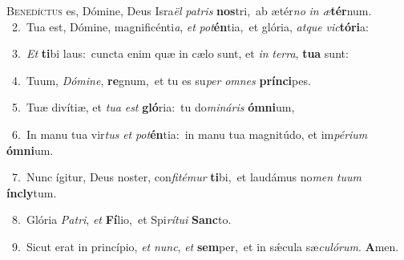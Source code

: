 \lettrine{\initial\textcolor{\initialcolor}{B}}{enedíctus} es, Dómine, Deus Isra\textit{ël} \textit{pa}\-\textit{tris} \textbf{nos}\-tri,~\star ab ætér\textit{no} \textit{in} \textit{æ}\-\textbf{tér}num.\\
{\numbfont\textcolor{\numbcolor}{~2.}}~Tua est, Dómine, magnificénti\-\textit{a}\-, \textit{et} \textit{pot}\-\textbf{én}tia,~\star et glória, \textit{at}\-\textit{que} \textit{vic}\-\textbf{tó}\textbf{ri}a:\par
{\numbfont\textcolor{\numbcolor}{~3.}}~\textit{Et} \textbf{ti}\-bi laus:~\star cuncta enim quæ in cælo sunt, et \textit{in} \textit{ter}\-\textit{ra}, \textbf{tu}\-\textbf{a} sunt:\par
{\numbfont\textcolor{\numbcolor}{~4.}}~Tuum, \textit{Dó}\-\textit{mi}\textit{ne}, \textbf{re}\-gnum,~\star et tu es su\textit{per} \textit{om}\-\textit{nes} \textbf{prín}\-\textbf{ci}pes.\par
{\numbfont\textcolor{\numbcolor}{~5.}}~Tuæ divítiæ, et \textit{tu}\-\textit{a} \textit{est} \textbf{gló}\-ria:~\star tu do\-\textit{mi}\-\textit{ná}\textit{ris} \textbf{óm}\-\textbf{ni}um,\par
{\numbfont\textcolor{\numbcolor}{~6.}}~In manu tua vir\textit{tus} \textit{et} \textit{pot}\-\textbf{én}tia:~\star in manu tua magnitúdo, et im\-\textit{pé}\-\textit{ri}\textit{um} \textbf{óm}\-\textbf{ni}um.\par
{\numbfont\textcolor{\numbcolor}{~7.}}~Nunc ígitur, Deus noster, con\-\textit{fi}\-\textit{té}\textit{mur} \textbf{ti}\-bi,~\star et laudámus no\textit{men} \textit{tu}\-\textit{um} \textbf{ín}\-\textbf{cly}tum.\par
{\numbfont\textcolor{\numbcolor}{~8.}}~Glória \textit{Pa}\-\textit{tri}, \textit{et} \textbf{Fí}\-lio,~\star et Spi\-\textit{rí}\-\textit{tu}\textit{i} \textbf{Sanc}\-to.\par
{\numbfont\textcolor{\numbcolor}{~9.}}~Sicut erat in princípio, \textit{et} \textit{nunc}\-, \textit{et} \textbf{sem}\-per,~\star et in sǽcula sæ\-\textit{cu}\-\textit{ló}\textit{rum}. \textbf{A}\-men.\par
